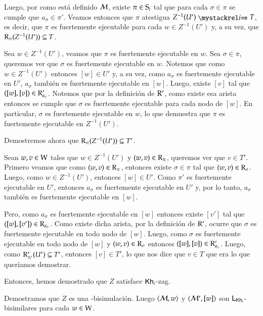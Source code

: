 \begin{demostracion}
\begin{itemize}
        Luego, por como está definido $\modults$, existe $\pi \in \S_i$ tal que para cada $\sigma \in \pi$ se cumple que $a_\sigma \in \pi'$. 
        Veamos entonces que $\pi$ atestigua $Z^{-1}(U') \ultsExecAgi T$, es decir, que $\pi$ es fuertemente ejecutable para cada $w \in Z^{-1}(U')$ 
        y, a su vez, que $\R_\pi(Z^{-1}(U')) \subseteq T$.

        Sea $w \in Z^{-1}(U')$, veamos que $\pi$ es fuertemente ejecutable en $w$. Sea $\sigma \in \pi$, queremos ver que $\sigma$ es fuertemente ejecutable 
        en $w$. Notemos que como $w \in Z^{-1}(U')$ entonces $[w] \in U'$ y, a su vez, como $a_\sigma$ es fuertemente ejecutable en $U'$, $a_\sigma$ también es fuertemente ejecutable en $[w]$. 
        Luego, existe $[v]$ tal que $([w],[v]) \in \R'_{a_\sigma}$. Notemos que por la definición de $\R'$, como existe esa arista entonces se cumple que $\sigma$ es fuertemente ejecutable 
        para cada nodo de $[w]$. En particular, $\sigma$ es fuertemente ejecutable en $w$, lo que demuestra que $\pi$ es fuertemente ejecutable 
        en $Z^{-1}(U')$.

        Demostremos ahora que $\R_{\pi}(Z^{-1}(U')) \subseteq T'$. 

        Sean $w, v \in \W$ tales que $w \in Z^{-1}(U')$ y $(w,v) \in \R_\pi$, queremos ver que $v \in T'$. Primero veamos que como $(w,v) \in \R_\pi$, 
        entonces existe $\sigma \in \pi$ tal que $(w,v) \in \R_\sigma$. Luego, como $w \in Z^{-1}(U')$, entonces $[w] \in U'$. Como $\pi'$ es fuertemente 
        ejecutable en $U'$, entonces $a_\sigma$ es fuertemente ejecutable en $U'$ y, por lo tanto, $a_\sigma$ también es fuertemente ejecutable en $[w]$.
        
        Pero, como $a_\sigma$ es fuertemente ejecutable en $[w]$ entonces existe $[v']$ tal que $([w],[v']) \in \R_{a_\sigma}$. 
        Como existe dicha arista, por la definición de $\R'$, ocurre que $\sigma$ es fuertemente ejecutable en todo nodo de $[w]$. 
        Luego, como $\sigma$ es fuertemente ejecutable en todo nodo de $[w]$ y $(w,v) \in \R_\sigma$ entonces $([w],[v]) \in \R'_{a_\sigma}$. 
        Luego, como $\R'_{\pi'}(U') \subseteq T'$, entonces $[v] \in T'$, lo que nos dice que $v \in T$ que era lo que queríamos demostrar.

        Entonces, hemos demostrado que $Z$ satisface $\khi$-zag.
    \end{itemize}
    Demostramos que $Z$ es una \KHilogic-bisimulación. Luego $\tup{\modults,w}$ y $\tup{\modults',[w]}$ son $\KHilogic$-bisimilares para cada $w \in \W$.
\end{demostracion}


